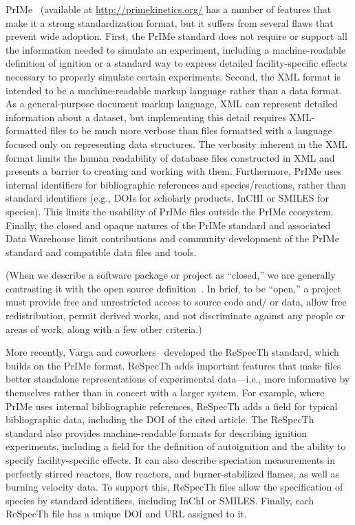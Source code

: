 \documentclass[12pt]{ijck}
\begin{document}
PrIMe~\autocite{Frenklach:2007bm,You:2011hy} (available at \url{http://primekinetics.org/}
has a number of features that make
it a strong standardization format, but it suffers from several flaws that
prevent wide adoption. First, the PrIMe standard does not require or support all
the information needed to simulate an experiment, including a machine-readable
definition of ignition or a standard way to express detailed facility-specific
effects necessary to properly simulate certain experiments. Second, the XML
format is intended to be a machine-readable markup language rather than a data format.
As a general-purpose document markup language, XML can represent detailed
information about a dataset, but implementing this detail requires XML-formatted
files to be much more verbose than files formatted with a language focused
only on representing data structures. The verbosity inherent in the XML format
limits the human readability of database files constructed in XML and presents a barrier to
creating and working with them. Furthermore, PrIMe uses
internal identifiers for bibliographic references and
species\slash reactions, rather than standard identifiers (e.g., DOIs for
scholarly products, InCHI or SMILES for species). This limits the usability of PrIMe files outside
the PrIMe ecosystem. Finally, the closed and opaque natures of the PrIMe standard
and associated Data Warehouse limit contributions and community development of
the PrIMe standard and compatible data files and tools.

(When we describe a software package or project as ``closed,'' we are generally
contrasting it with the open source definition~\cite{opensource}. In brief, to be
``open,'' a project must provide free and unrestricted access to source code and\slash
or data, allow free redistribution, permit derived works, and not discriminate against
any people or areas of work, along with a few other criteria.)

More recently, Varga and coworkers~\autocite{Varga2015a,Varga2017} developed the
ReSpecTh standard, which builds on the PrIMe format. ReSpecTh adds important
features that make files better standalone representations of experimental
data---i.e., more informative by themselves rather than in concert with a larger
system. For example, where PrIMe uses internal bibliographic references,
ReSpecTh adds a field for typical bibliographic data, including the DOI of
the cited article. The ReSpecTh standard also
provides machine-readable formats for describing ignition experiments, including
a field for the definition of autoignition and the ability to specify
facility-specific effects. It can also describe speciation measurements in
perfectly stirred reactors, flow reactors, and burner-stabilized flames, as well as
burning velocity data. To support this, ReSpecTh files allow the specification of species by
standard identifiers, including InChI or SMILES. Finally, each ReSpecTh file
has a unique DOI and URL assigned to it.
\end{document}
